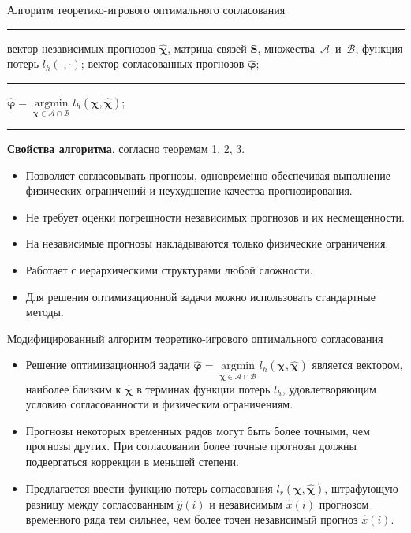 \documentclass{beamer}
\newcommand\argmin{\mathop{\arg\min}}
\newcommand{\A}{\mathcal{A}}
\newcommand{\hchi}{\hat{\boldsymbol{\chi}}}
\newcommand{\hphi}{\hat{\boldsymbol{\varphi}}}
\newcommand{\B}{\mathcal{B}}
\newcommand{\hx}{\hat{x}}
\newcommand{\hy}{\hat{y}}
\newcommand{\SM}{\mathbf{S}}
\begin{document}
\begin{frame}{Алгоритм теоретико-игрового оптимального согласования}
    \footnotesize
    \begin{algorithmic}[1]
    \medskip\hrule\medskip
        \REQUIRE вектор независимых прогнозов $\hchi$, матрица
        связей $\SM$, множества~$\A$~и~$\B$, функция потерь $l_h(\cdot, \cdot)$;
        \ENSURE вектор согласованных прогнозов $\hphi$;
    \medskip\hrule\medskip
        \STATE $\hphi = \argmin\limits_{\boldsymbol{\chi} \in \A \cap
            \B} l_h(\boldsymbol{\chi}, \hchi)$;
    \medskip\hrule\medskip
    \end{algorithmic}

    \textbf{Свойства алгоритма}, согласно теоремам 1, 2, 3.

    \begin{itemize}
        \item Позволяет согласовывать прогнозы, одновременно
        обеспечивая выполнение физических ограничений и
        неухудшение качества прогнозирования.
        \item Не требует оценки погрешности независимых прогнозов
        и их несмещенности.
        \item На независимые прогнозы накладываются только
        физические ограничения.
        \item Работает с иерархическими структурами любой
        сложности.
        \item Для решения оптимизационной задачи можно
        использовать стандартные методы.
    \end{itemize}
\end{frame}
\begin{frame}{Модифицированный алгоритм теоретико-игрового оптимального согласования}
    \begin{itemize}
    \item Решение оптимизационной задачи
        $\hphi = \argmin\limits_{\boldsymbol{\chi} \in \A \cap
            \B} l_h(\boldsymbol{\chi}, \hchi)$
        является вектором, наиболее близким к $\hchi$ в терминах
        функции потерь $l_h$, удовлетворяющим условию согласованности
        и физическим ограничениям.
    \vspace{0.3cm}

    \item Прогнозы некоторых временных рядов могут быть более
        точными, чем прогнозы других. \textcolor[rgb]{1.00,0.00,0.00}{При согласовании более
        точные
        прогнозы должны подвергаться коррекции в меньшей степени.}
    \vspace{0.3cm}

    \item Предлагается ввести \textcolor[rgb]{1.00,0.00,0.00}{функцию потерь согласования $l_r(\boldsymbol{\chi},
        \hchi)$}, штрафующую разницу между согласованным
        $\hy(i)$
        и независимым $\hx(i)$ прогнозом временного ряда тем сильнее, чем более
        точен независимый прогноз $\hx(i)$.
    \end{itemize}
\end{frame}
\end{document}
